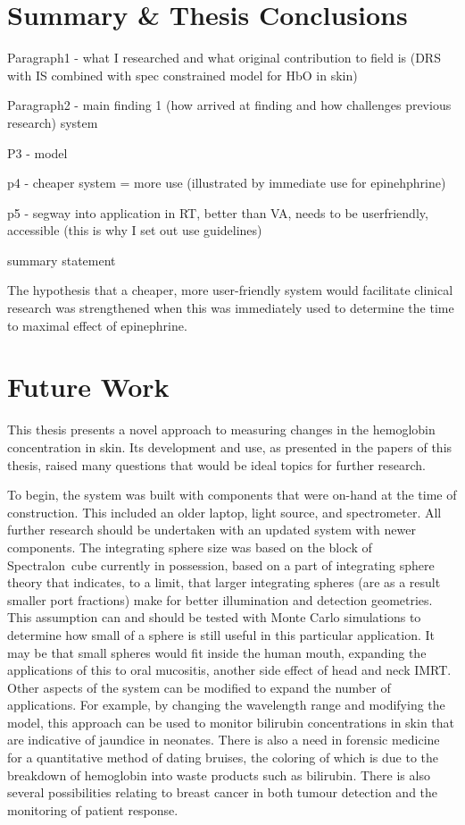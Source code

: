 \section{Summary \& Thesis Conclusions}
Paragraph1 - what I researched and what original contribution to field is (DRS with IS combined with spec constrained model for HbO in skin)

Paragraph2 - main finding 1 (how arrived at finding and how challenges previous research) system

P3 - model

p4 - cheaper system = more use (illustrated by immediate use for epinehphrine)

p5 - segway into application in RT, better than VA, needs to be userfriendly, accessible (this is why I set out use guidelines)

summary statement

The hypothesis that a cheaper, more user-friendly system would facilitate clinical research was strengthened when this was immediately used to determine the time to maximal effect of epinephrine.

\section{Future Work}
This thesis presents a novel approach to measuring changes in the hemoglobin concentration in skin. Its development and use, as presented in the papers of this thesis, raised many questions that would be ideal topics for further research.

To begin, the system was built with components that were on-hand at the time of construction. This included an older laptop, light source, and spectrometer. All further research should be undertaken with an updated system with newer components. The integrating sphere size was based on the block of Spectralon\textregistered~cube currently in possession, based on a part of integrating sphere theory that indicates, to a limit, that larger integrating spheres (are as a result smaller port fractions) make for better illumination and detection geometries. This assumption can and should be tested with Monte Carlo simulations to determine how small of a sphere is still useful in this particular application. It may be that small spheres would fit inside the human mouth, expanding the applications of this to oral mucositis, another side effect of head and neck IMRT.\cite{Hancock2003} Other aspects of the system can be modified to expand the number of applications. For example, by changing the wavelength range and modifying the model, this approach can be used to monitor bilirubin concentrations in skin that are indicative of jaundice in neonates.\cite{Randeberg2005} There is also a need in forensic medicine for a quantitative method of dating bruises,\cite{Randeberg2006} the coloring of which is due to the breakdown of hemoglobin into waste products such as bilirubin. There is also several possibilities relating to breast cancer in both tumour detection\cite{Peters1990,Tromberg2005} and the monitoring of patient response.\cite{Porock1999,Tromberg2010}

